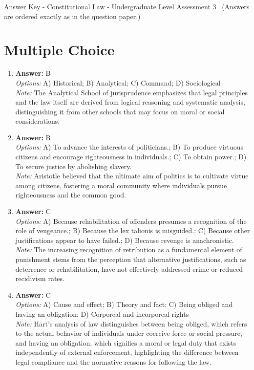 \documentclass[12pt]{article}
\begin{document}
\begin{center}
Answer Key - Constitutional Law - Undergraduate Level Assessment 3 \
\small (Answers are ordered exactly as in the question paper.)
\end{center}

\section*{Multiple Choice}
\begin{enumerate}[label=\arabic*.]
\item \textbf{Answer:} B
\\ \textit{Options:} A) Historical; B) Analytical; C) Command; D) Sociological
\\ \textit{Note:} The Analytical School of jurisprudence emphasizes that legal principles and the law itself are derived from logical reasoning and systematic analysis, distinguishing it from other schools that may focus on moral or social considerations.
\item \textbf{Answer:} B
\\ \textit{Options:} A) To advance the interests of politicians.; B) To produce virtuous citizens and encourage righteousness in individuals.; C) To obtain power.; D) To secure justice by abolishing slavery.
\\ \textit{Note:} Aristotle believed that the ultimate aim of politics is to cultivate virtue among citizens, fostering a moral community where individuals pursue righteousness and the common good.
\item \textbf{Answer:} C
\\ \textit{Options:} A) Because rehabilitation of offenders presumes a recognition of the role of vengeance.; B) Because the lex talionis is misguided.; C) Because other justifications appear to have failed.; D) Because revenge is anachronistic.
\\ \textit{Note:} The increasing recognition of retribution as a fundamental element of punishment stems from the perception that alternative justifications, such as deterrence or rehabilitation, have not effectively addressed crime or reduced recidivism rates.
\item \textbf{Answer:} C
\\ \textit{Options:} A) Cause and effect; B) Theory and fact; C) Being obliged and having an obligation; D) Corporeal and incorporeal rights
\\ \textit{Note:} Hart's analysis of law distinguishes between being obliged, which refers to the actual behavior of individuals under coercive force or social pressure, and having an obligation, which signifies a moral or legal duty that exists independently of external enforcement, highlighting the difference between legal compliance and the normative reasons for following the law.

\end{enumerate}
\end{document}
